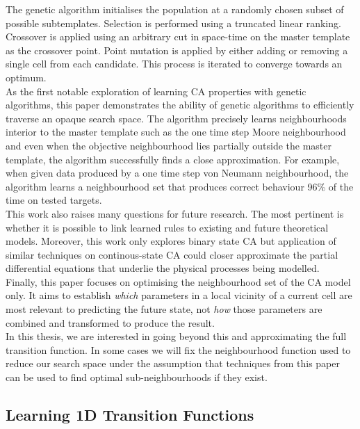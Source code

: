 The genetic algorithm initialises the population at a randomly chosen subset of possible subtemplates. Selection is performed using a truncated linear ranking. Crossover is applied using an arbitrary cut in space-time on the master template as the crossover point. Point mutation is applied by either adding or removing a single cell from each candidate. This process is iterated to converge towards an optimum.\\

As the first notable exploration of learning CA properties with genetic algorithms, this paper demonstrates the ability of genetic algorithms to efficiently traverse an opaque search space. The algorithm precisely learns neighbourhoods interior to the master template such as the one time step Moore neighbourhood and even when the objective neighbourhood lies partially outside the master template, the algorithm successfully finds a close approximation. For example, when given data produced by a one time step von Neumann neighbourhood, the algorithm learns a neighbourhood set that produces correct behaviour 96\% of the time on tested targets.\\

This work also raises many questions for future research. The most pertinent is whether it is possible to link learned rules to existing and future theoretical models. Moreover, this work only explores binary state CA but application of similar techniques on continous-state CA could closer approximate the partial differential equations that underlie the physical processes being modelled.\\

Finally, this paper focuses on optimising the neighbourhood set of the CA model only. It aims to establish \textit{which} parameters in a local vicinity of a current cell are most relevant to predicting the future state, not \textit{how} those parameters are combined and transformed to produce the result.\\ In this thesis, we are interested in going beyond this and approximating the full transition function. In some cases we will fix the neighbourhood function used to reduce our search space under the assumption that techniques from this paper can be used to find optimal sub-neighbourhoods if they exist.\\


\subsection{Learning 1D Transition Functions}

